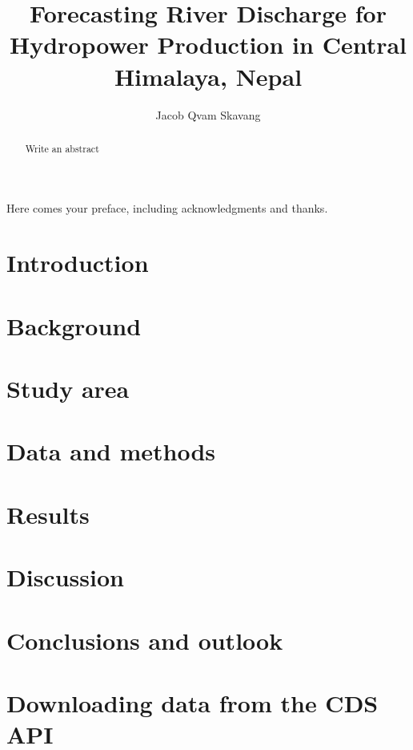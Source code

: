 \documentclass[USenglish]{uiomaster}  %
\author{Jacob Qvam Skavang}
\title{Forecasting River Discharge for Hydropower Production in Central Himalaya, Nepal}
\begin{document}
\uiomasterfp[dept={Department of Geosciences},  %
  program={Hydrology and Glaciology},                        %
  supervisors = {Olga Silantyeva \\ Lena Merete Tallaksen \\ Kristoffer Aalstad}, color = blue, master, long                 %
]                                     %

\frontmatter{}

\begin{abstract}
    Write an abstract
\end{abstract}

\tableofcontents{}
\listoffigures{}
\listoftables{}

\begin{preface}
  Here comes your preface, including acknowledgments and thanks.
\end{preface}

\mainmatter{}

\chapter{Introduction}


\chapter{Background}


\chapter{Study area}


\chapter{Data and methods}


\chapter{Results}


\chapter{Discussion}


\chapter{Conclusions and outlook}


\appendix           %


\chapter{Downloading data from the CDS API}


\backmatter{}
\printbibliography{}
\end{document}
